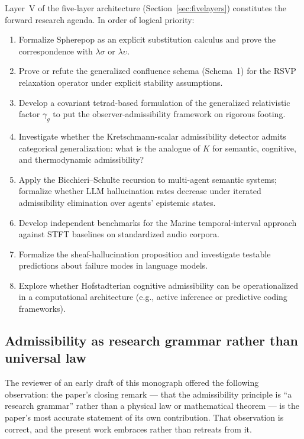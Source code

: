 \documentclass[12pt, a4paper]{article}
\theoremstyle{plain}
\theoremstyle{definition}
\theoremstyle{remark}
\begin{document}
Layer~V of the five-layer architecture (Section~\ref{sec:fivelayers})
constitutes the forward research agenda.
In order of logical priority:
\begin{enumerate}
  \item Formalize Spherepop as an explicit substitution calculus and
        prove the correspondence with $\lambda\sigma$ or $\lambda\upsilon$.
  \item Prove or refute the generalized confluence schema
        (Schema~1) for the RSVP relaxation operator under explicit
        stability assumptions.
  \item Develop a covariant tetrad-based formulation of the
        generalized relativistic factor $\gamma_g$ to put the
        observer-admissibility framework on rigorous footing.
  \item Investigate whether the Kretschmann-scalar admissibility
        detector admits categorical generalization:
        what is the analogue of $K$ for semantic, cognitive, and
        thermodynamic admissibility?
  \item Apply the Bicchieri--Schulte recursion to multi-agent
        semantic systems; formalize whether LLM hallucination rates
        decrease under iterated admissibility elimination over
        agents' epistemic states.
  \item Develop independent benchmarks for the Marine
        temporal-interval approach against STFT baselines on
        standardized audio corpora.
  \item Formalize the sheaf-hallucination proposition and investigate
        testable predictions about failure modes in language models.
  \item Explore whether Hofstadterian cognitive admissibility can be
        operationalized in a computational architecture (e.g.,
        active inference or predictive coding frameworks).
\end{enumerate}

\subsection{Admissibility as research grammar rather than universal law}

The reviewer of an early draft of this monograph offered the following
observation: the paper's closing remark --- that the admissibility
principle is ``a research grammar'' rather than a physical law or
mathematical theorem --- is the paper's most accurate statement of
its own contribution.
That observation is correct, and the present work embraces rather
than retreats from it.
\end{document}
